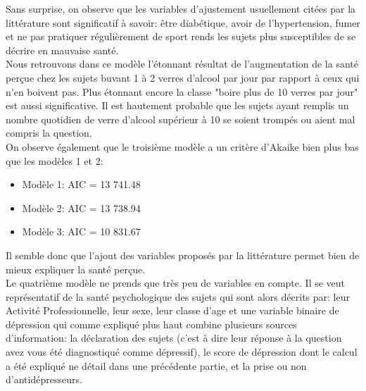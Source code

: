 \documentclass{book}
\begin{document}
\noindent
Sans surprise, on observe que les variables d'ajustement usuellement citées par la littérature sont significatif à savoir: être diabétique, avoir de l'hypertension, fumer et ne pas pratiquer régulièrement de sport rends les sujets plus susceptibles de se décrire en mauvaise santé.\\
Nous retrouvons dans ce modèle l'étonnant résultat de l'augmentation de la santé perçue chez les sujets buvant 1 à 2 verres d'alcool par jour par rapport à ceux qui n'en boivent pas. Plus étonnant encore la classe "boire plus de 10 verres par jour" est aussi significative. Il est hautement probable que les sujets ayant remplis un nombre quotidien de verre d'alcool supérieur à 10 se soient trompés ou aient mal compris la question. \\
\newpage
\noindent
On observe également que le troisième modèle a un critère d'Akaike bien plus bas que les modèles 1 et 2:\\
\begin{itemize}
\item Modèle 1: AIC =  13 741.48
\item Modèle 2: AIC =  13 738.94
\item Modèle 3: AIC =  10 831.67
\end{itemize}
\noindent
Il semble donc que l'ajout des variables proposés par la littérature permet bien de mieux expliquer la santé perçue.\\

\bigskip
\noindent
Le quatrième modèle ne prends que très peu de variables en compte. Il se veut représentatif de la santé psychologique des sujets qui sont alors décrits par: leur Activité Professionnelle, leur sexe, leur classe d'age et une variable binaire de dépression qui comme expliqué plus haut combine plusieurs sources d'information: la déclaration des sujets (c'est à dire leur réponse à la question avez vous été diagnostiqué comme dépressif), le score de dépression dont le calcul a été expliqué ne détail dans une précédente partie, et la prise ou non d'antidépresseurs.\\
\end{document}
